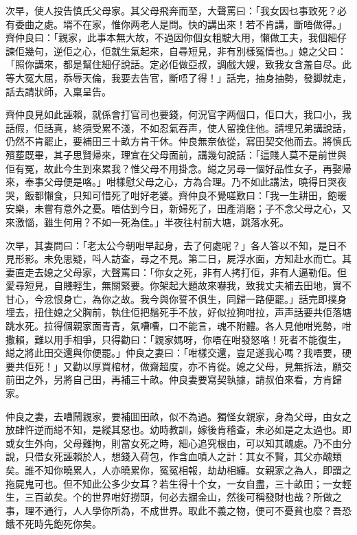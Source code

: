 \documentclass[a5paper, 12pt, openany]{book} %
\begin{document}
	次早，使人投告慎氏父母家。其父母飛奔而至，大聲罵曰：「我女因乜事致死？必有委曲之處。壻不在家，惟你两老人是問。快的講出來！若不肯講，斷唔做得。」齊仲良曰：「親家，此事本無大故，不過因你個女粗駛大用，懶做工夫，我個細仔諫佢幾句，逆佢之心，佢就生氣起來，自尋短見，非有別樣冤情也。」媳之父曰：「照你講來，都是幫住細仔說話。定必佢做亞叔，調戲大嫂，致我女含羞自尽。此等大冤大屈，忝辱天倫，我要去告官，斷唔了得！」話完，抽身抽勢，發脚就走，話去請狀師，入稟呈告。

	齊仲良見如此誣賴，就係會打官司也要錢，何況官字两個口，佢口大，我口小，我話假，佢話真，終須受累不淺，不如忍氣吞声，使人留挽住他。請埋兄弟講說話，仍然不肯罷止，要補田三十畝方肯干休。仲良無奈依從，寫田契交他而去。將慎氏殯塟既畢，其子思賢帰來，理宜在父母面前，講幾句說話：「這賤人莫不是前世與佢有冤，故此今生到來累我？惟父母不用掛念。縂之另尋一個好品性女子，再娶帰來，奉事父母便是咯。」咁樣慰父母之心，方為合理。乃不如此講法，曉得日哭夜哭，飯都懶食，只知可惜死了咁好老婆。齊仲良不覺嗟歎曰：「我一生耕田，飽暖安樂，未嘗有意外之憂。唔估到今日，新婦死了，田產消磨；子不念父母之心，又來激惱，雖生何用？不如一死為佳。」半夜往村前大塘，跳落水死。

	次早，其妻問曰：「老太公今朝咁早起身，去了何處呢？」各人答以不知，是日不見形影。未免思疑，呌人訪查，尋之不見。第二日，屍浮水面，方知赴水而亡。其妻直走去媳之父母家，大聲罵曰：「你女之死，非有人拷打佢，非有人逼勒佢。但愛尋短見，自賤輕生，無關緊要。你架起大題故來嚇我，致我丈夫補去田地，實不甘心，今忿恨身亡，為你之故。我今與你誓不俱生，同歸一路便罷。」話完即撲身埋去，扭住媳之父胸前，執住佢把鬚死手不放，好似拉狗咁拉，声声話要共佢落塘跳水死。拉得個親家面青青，氣嘈嘈，口不能言，魂不附體。各人見他咁兇勢，咁撒賴，難以用手相爭，只得勸曰：「親家媽呀，你唔在咁發怒咯！死者不能復生，縂之將此田交還與你便罷。」仲良之妻曰：「咁樣交還，豈足遂我心嗎？我唔要，硬要共佢死！」又勸以厚買棺材，做齋超度，亦不肯從。媳之父母，見無拆法，願交前田之外，另將自己田，再補三十畝。仲良妻要寫契執據，請叔伯來看，方肯歸家。

	仲良之妻，去嘈鬧親家，要補囬田畝，似不為過。獨怪女親家，身為父母，由女之放肆忤逆而縂不知，是縱其惡也。幼時教訓，嫁後肯稽查，未必如是之太過也。即或女生外向，父母難拘，則當女死之時，細心追究根由，可以知其醜處。乃不由分說，只借女死誣賴於人，想錢入荷包，作含血噴人之計：其女不賢，其父亦醜類矣。誰不知你曉累人，人亦曉累你，冤冤相報，劫劫相纏。女親家之為人，即謂之拖屍鬼可也。但不知此公多少女耳？若生得十个女，一女自盡，三十畝田；一女輕生，三百畝矣。个的世界咁好撈頭，何必去掘金山，然後可稱發財也哉？所做之事，理不通行，人人學你所為，不成世界。取此不義之物，便可不憂貧也麼？吾恐餓不死時先飽死你矣。
\end{document}
